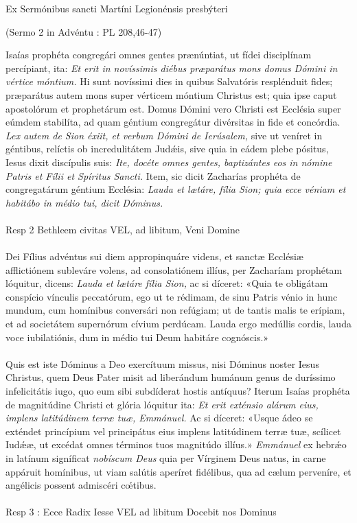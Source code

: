 \documentclass[options]{article}
\begin{document}
Ex Sermónibus sancti Martíni Legionénsis presbýteri 
	\begin{flushright}
	(Sermo 2 in Advéntu : PL 208,46-47)
	\end{flushright}
Isaías prophéta congregári omnes gentes prænúntiat, ut fídei disciplínam percípiant, ita: \emph{Et erit in novíssimis diébus præparátus mons domus Dómini in vértice móntium.} Hi sunt novíssimi dies in quibus Salvatóris resplénduit fides; præparátus autem mons super vérticem móntium Christus est; quia ipse caput apostolórum et prophetárum est. Domus Dómini vero Christi est Ecclésia super eúmdem stabilíta, ad quam géntium congregátur divérsitas in fide et concórdia. \emph{Lex autem de Sion éxiit, et verbum Dómini de Ierúsalem,} sive ut veníret in géntibus, relíctis ob incredulitátem Jud\'{æ}is, sive quia in eádem plebe pósitus, Iesus dixit discípulis suis: \emph{Ite, docéte omnes gentes, baptizántes eos in nómine Patris et Fílii et Spíritus Sancti.} Item, sic dicit Zacharías prophéta de congregatárum géntium Ecclésia: \emph{Lauda et lætáre, fília Sion; quia ecce véniam et habitábo in médio tui, dicit Dóminus.}\\
\\
Resp 2 Bethleem civitas VEL, ad libitum, Veni Domine\\
\\
Dei Fílius advéntus sui diem appropinquáre videns, et sanctæ Ecclésiæ afflictiónem subleváre volens, ad consolatiónem illíus, per Zacharíam prophétam lóquitur, dicens: \emph{Lauda et lætáre fília Sion,} ac si díceret: «Quia te obligátam conspício vínculis peccatórum, ego ut te rédimam, de sinu Patris vénio in hunc mundum, cum homínibus conversári non refúgiam; ut de tantis malis te erípiam, et ad societátem supernórum cívium perdúcam. Lauda ergo medúllis cordis, lauda voce iubilatiónis, dum in médio tui Deum habitáre cognóscis.»\\
\\
Quis est iste Dóminus a Deo exercítuum missus, nisi Dóminus noster Iesus Christus, quem Deus Pater misit ad liberándum humánum genus de duríssimo infelicitátis iugo, quo eum sibi subdíderat hostis antíquus? Iterum Isaías prophéta de magnitúdine Christi et glória lóquitur ita: \emph{Et erit exténsio alárum eius, implens latitúdinem terræ tuæ, Emmánuel.} Ac si díceret: «Usque ádeo se exténdet princípium vel principátus eius implens latitúdinem terræ tuæ, scílicet Iud\'{æ}æ, ut excédat omnes términos tuos magnitúdo illíus.» \emph{Emmánuel} ex hebr\'{æ}o in latínum signíficat \emph{nobíscum Deus} quia per Vírginem Deus natus, in carne appáruit homínibus, ut viam salútis aperíret fidélibus, qua ad cælum perveníre, et angélicis possent admiscéri c\'{œ}tibus.\\
\\
Resp 3 : Ecce Radix Iesse VEL ad libitum Docebit nos Dominus
\end{document}
